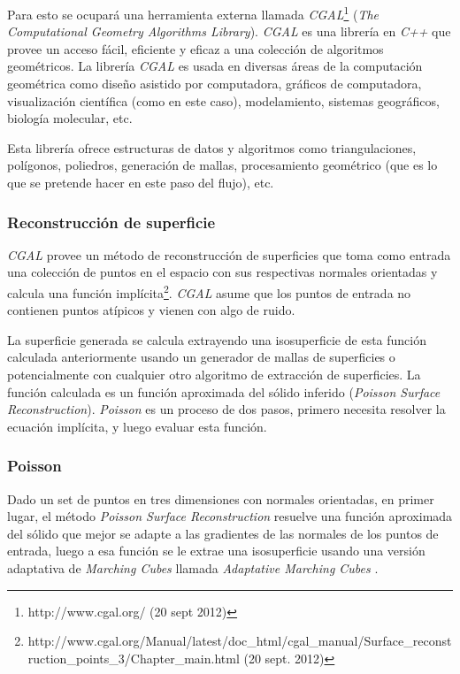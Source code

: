 Para esto se ocupará una herramienta externa llamada \emph{CGAL}\footnote{http://www.cgal.org/ (20 sept 2012)} (\emph{The Computational Geometry Algorithms Library}). \emph{CGAL} es una librería en \emph{C++} que provee un acceso fácil, eficiente y eficaz a una colección de algoritmos geométricos. La librería \emph{CGAL} es usada en diversas áreas de la computación geométrica como diseño asistido por computadora, gráficos de computadora, visualización científica (como en este caso), modelamiento, sistemas geográficos, biología molecular, etc.

Esta librería ofrece estructuras de datos y algoritmos como triangulaciones, polígonos, poliedros, generación de mallas, procesamiento geométrico (que es lo que se pretende hacer en este paso del flujo), etc.

\subsubsection{Reconstrucción de superficie}
\label{ch:propuesta:sec:refinamiento:reconstruccionDeSuperficie}

\emph{CGAL} provee un método de reconstrucción de superficies que toma como entrada una colección de puntos en el espacio con sus respectivas normales orientadas y calcula una función implícita\footnote{http://www.cgal.org/Manual/latest/doc\_html/cgal\_manual/Surface\_reconstruction\_points\_3/Chapter\_main.html (20 sept. 2012)}. \emph{CGAL} asume que los puntos de entrada no contienen puntos atípicos y vienen con algo de ruido.

La superficie generada se calcula extrayendo una isosuperficie de esta función calculada anteriormente usando un generador de mallas de superficies \cite{Rineau2007100} o potencialmente con cualquier otro algoritmo de extracción de superficies. La función calculada es un función aproximada del sólido inferido (\emph{Poisson Surface Reconstruction}). \emph{Poisson} es un proceso de dos pasos, primero necesita resolver la ecuación implícita, y luego evaluar esta función.

\subsubsection{Poisson}
\label{ch:propuesta:sec:refinamiento:poisson}

Dado un set de puntos en tres dimensiones con normales orientadas, en primer lugar, el método \emph{Poisson Surface Reconstruction} \cite{Kazhdan2006PoissonSurfaceReconstruction} resuelve una función aproximada del sólido que mejor se adapte a las gradientes de las normales de los puntos de entrada, luego a esa función se le extrae una isosuperficie usando una versión adaptativa de \emph{Marching Cubes} llamada \emph{Adaptative Marching Cubes} \cite{Shu95adaptivemarching}.

